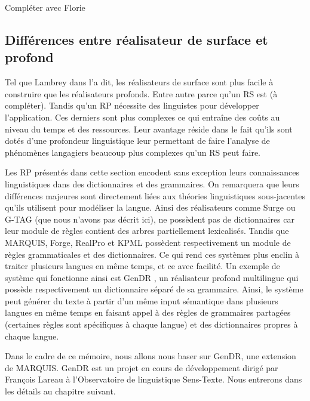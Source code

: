 Compléter avec Florie

\subsection{Différences entre réalisateur de surface et profond}
Tel que Lambrey dans \citep{LambreyImplementationcollocationspour2017} l'a dit, les réalisateurs de surface sont plus facile à construire que les réalisateurs profonds. Entre autre parce qu'un RS est (à compléter). Tandis qu'un RP nécessite des linguistes pour développer l'application. Ces derniers sont plus complexes ce qui entraîne des coûts au niveau du temps et des ressources. Leur avantage réside dans le fait qu'ils sont dotés d'une profondeur linguistique leur permettant de faire l'analyse de phénomènes langagiers beaucoup plus complexes qu'un RS peut faire. 

Les RP présentés dans cette section encodent sans exception leurs connaissances linguistiques dans des dictionnaires et des grammaires. On remarquera que leurs différences majeures sont directement liées aux théories linguistiques sous-jacentes qu'ils utilisent pour modéliser la langue. Ainsi des réalisateurs comme Surge ou G-TAG (que nous n'avons pas décrit ici), ne possèdent pas de dictionnaires car leur module de règles contient des arbres partiellement lexicalisés. Tandis que MARQUIS, Forge, RealPro et KPML possèdent respectivement un module de règles grammaticales et des dictionnaires. Ce qui rend ces systèmes plus enclin à traiter plusieurs langues en même temps, et ce avec facilité. Un exemple de système qui fonctionne ainsi est GenDR \citep{lareau18}, un réalisateur profond multilingue qui possède respectivement un dictionnaire séparé de sa grammaire. Ainsi, le système peut générer du texte à partir d'un même input sémantique dans plusieurs langues en même temps en faisant appel à des règles de grammaires partagées (certaines règles sont spécifiques à chaque langue) et des dictionnaires propres à chaque langue.

Dans le cadre de ce mémoire, nous allons nous baser sur GenDR, une extension de MARQUIS. GenDR est un projet en cours de développement dirigé par François Lareau à l’Observatoire de linguistique Sens-Texte. Nous entrerons dans les détails au chapitre suivant.